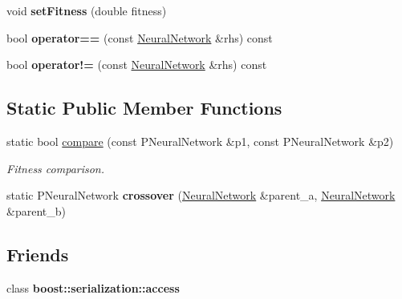\begin{DoxyCompactItemize}
\item 
void {\bfseries set\+Fitness} (double fitness)\hypertarget{classNeuralNetwork_a9be745ebf5c3f469791439aee1835b0a}{}\label{classNeuralNetwork_a9be745ebf5c3f469791439aee1835b0a}

\item 
bool {\bfseries operator==} (const \hyperlink{classNeuralNetwork}{Neural\+Network} \&rhs) const \hypertarget{classNeuralNetwork_a2a3aff2fe2ee178914a3676ad4c88c51}{}\label{classNeuralNetwork_a2a3aff2fe2ee178914a3676ad4c88c51}

\item 
bool {\bfseries operator!=} (const \hyperlink{classNeuralNetwork}{Neural\+Network} \&rhs) const \hypertarget{classNeuralNetwork_ae5ac2160c59e9b38d551bff997e52645}{}\label{classNeuralNetwork_ae5ac2160c59e9b38d551bff997e52645}

\end{DoxyCompactItemize}
\subsection*{Static Public Member Functions}
\begin{DoxyCompactItemize}
\item 
static bool \hyperlink{classNeuralNetwork_ac6e9655da50b97ca94f4e34bf3de3adc}{compare} (const P\+Neural\+Network \&p1, const P\+Neural\+Network \&p2)
\begin{DoxyCompactList}\small\item\em Fitness comparison. \end{DoxyCompactList}\item 
static P\+Neural\+Network {\bfseries crossover} (\hyperlink{classNeuralNetwork}{Neural\+Network} \&parent\+\_\+a, \hyperlink{classNeuralNetwork}{Neural\+Network} \&parent\+\_\+b)\hypertarget{classNeuralNetwork_a1168869bf81b753ae8b20ea518e11593}{}\label{classNeuralNetwork_a1168869bf81b753ae8b20ea518e11593}

\end{DoxyCompactItemize}
\subsection*{Friends}
\begin{DoxyCompactItemize}
\item 
class {\bfseries boost\+::serialization\+::access}\hypertarget{classNeuralNetwork_ac98d07dd8f7b70e16ccb9a01abf56b9c}{}\label{classNeuralNetwork_ac98d07dd8f7b70e16ccb9a01abf56b9c}

\end{DoxyCompactItemize}


